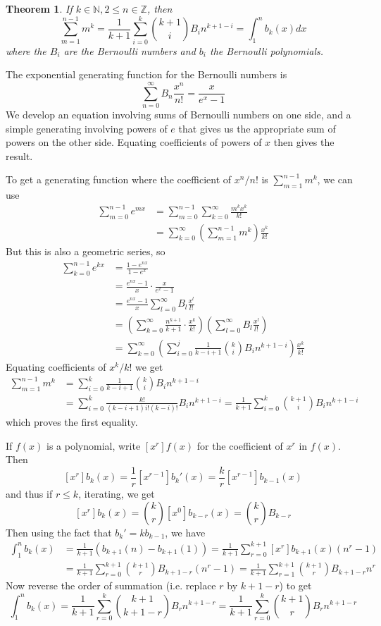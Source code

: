 \documentclass[12pt]{article}
\newcommand{\Nats}{\mathbb{N}}
\newcommand{\Ints}{\mathbb{Z}}
\newtheorem{thm}{Theorem}[section]
\begin{document}
\begin{thm}If $k\in\Nats, 2\leq n\in\Ints$, then
\[\sum_{m=1}^{n-1}m^k = \frac{1}{k+1}\sum_{i=0}^k \binom{k+1}{i}B_in^{k+1-i}=\int_1^n b_k(x)dx\]
where the $B_i$ are the Bernoulli numbers and $b_i$ the Bernoulli polynomials.
\end{thm}

The exponential generating function for the Bernoulli numbers is
\[\sum_{n=0}^{\infty}B_n\frac{x^n}{n!}=\frac{x}{e^x-1}\]
We develop an equation involving sums of Bernoulli numbers on one side, and a simple generating involving powers of $e$ that gives us the appropriate sum of powers on the other side. Equating coefficients of powers of $x$ then gives the result.

To get a generating function where the coefficient of $x^n/n!$ is $\sum_{m=1}^{n-1}m^k$, we can use
\begin{align*}
  \sum_{m=0}^{n-1} e^{mx} 
     &= \sum_{m=0}^{n-1} \sum_{k=0}^{\infty} \frac{m^k x^k}{k!}\\
     &= \sum_{k=0}^{\infty}\left(\sum_{m=1}^{n-1} m^k\right)\frac{x^k}{k!}
\end{align*}
But this is also a geometric series, so
\begin{align*}
  \sum_{k=0}^{n-1}e^{kx} &= \frac{1-e^{nx}}{1-e^x}\\
    &= \frac{e^{nx}-1}{x}\cdot\frac{x}{e^x-1} \\
    &= \frac{e^{nx}-1}{x}\sum_{l=0}^{\infty}B_l\frac{x^l}{l!} \\
    &= \left(\sum_{k=0}^{\infty}\frac{n^{k+1}}{k+1}\cdot\frac{x^k}{k!}\right)
       \left(\sum_{l=0}^{\infty}B_l\frac{x^l}{l!}\right) \\
    &=\sum_{k=0}^{\infty}
            \left(\sum_{i=0}^j \frac{1}{k-i+1}\binom{k}{i}B_in^{k+1-i}\right)\frac{x^k}{k!}
\end{align*}
Equating coefficients of $x^k/k!$ we get
\begin{align*}\sum_{m=1}^{n-1}m^k&=\sum_{i=0}^k \frac{1}{k-i+1}\binom{k}{i}B_i n^{k+1-i}\\
&=\sum_{i=0}^k\frac{k!}{(k-i+1)i!(k-i)!}B_in^{k+1-i}=\frac{1}{k+1}\sum_{i=0}^k\binom{k+1}{i}B_in^{k+1-i}
\end{align*}
which proves the first equality.

If $f(x)$ is a polynomial, write $[x^r]f(x)$ for the coefficient of $x^r$ in $f(x)$. Then
\[[x^r]b_k(x)=\frac{1}{r}[x^{r-1}]b_k'(x)=\frac{k}{r}[x^{r-1}]b_{k-1}(x)\]
and thus if $r\leq k$, iterating, we get
\[[x^r]b_k(x)=\binom{k}{r}[x^0]b_{k-r}(x)=\binom{k}{r}B_{k-r}\]
Then using the fact that $b_k'=kb_{k-1}$, we have
\begin{align*}
\int_1^n b_k(x)&=\frac{1}{k+1}(b_{k+1}(n)-b_{k+1}(1)) = \frac{1}{k+1}\sum_{r=0}^{k+1}[x^r]b_{k+1}(x)(n^r-1)\\
&= \frac{1}{k+1}\sum_{r=0}^{k+1}\binom{k+1}{r}B_{k+1-r}(n^r-1) = \frac{1}{k+1}\sum_{r=1}^{k+1}\binom{k+1}{r}B_{k+1-r}n^r
\end{align*}
Now reverse the order of summation (i.e. replace $r$ by $k+1-r$) to get
\[
\int_1^n b_k(x)=\frac{1}{k+1}\sum_{r=0}^k\binom{k+1}{k+1-r}B_rn^{k+1-r}=\frac{1}{k+1}\sum_{r=0}^k\binom{k+1}{r}B_r n^{k+1-r}\]
\end{document}
